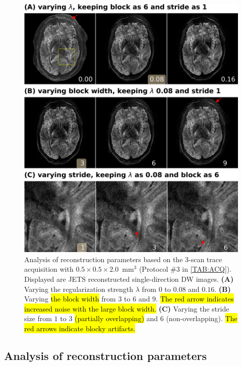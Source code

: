 \documentclass[preprint,12pt,authoryear,review]{elsarticle}
\begin{document}
    \begin{figure}
        \centering
        \includegraphics[width=\textwidth]{../figures/fig6.png}
        \caption{Analysis of reconstruction parameters based on
        the 3-scan trace acquisition with $0.5\times0.5\times2.0$~mm$^3$
        (Protocol \#3 in \cref{TAB:ACQ}).
        Displayed are JETS reconstructed single-direction DW images.
        \textbf{(A)} Varying the regularization strength $\lambda$
        from $0$ to $0.08$ and $0.16$.
        \textbf{(B)} Varying \hl{the block width} from $3$ to $6$ and $9$.
        \hl{The red arrow indicates increased noise
        with the large block width.}
        \textbf{(C)} Varying the stride size from $1$ to
        $3$ \hl{(partially overlapping)} and
        $6$ (non-overlapping).
        \hl{The red arrows indicate blocky artifacts.}}
        \label{FIG:ablation}
    \end{figure}

    \subsection{Analysis of reconstruction parameters}
\end{document}
